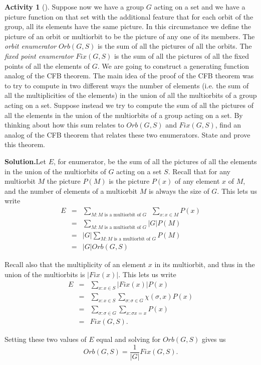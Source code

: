 \documentclass[10pt,]{book}
\theoremstyle{plain}
\theoremstyle{definition}
\newtheorem{activity}[project]{Activity}
\numberwithin{equation}{chapter}
\newcommand{\amp}{&}
\begin{document}
\begin{activity}[]\label{Orbit-FixedPoint}
Suppose now we have a group \(G\) acting on a set and we have a picture function on that set with the additional feature that for each orbit of the group, all its elements have the same picture. In this circumstance we define the picture of an orbit or multiorbit to be the picture of any one of its members. The \emph{orbit enumerator} \({ Orb}(G,S)\) is the sum of all the pictures of all the orbits. The \emph{fixed point enumerator} \({ Fix}(G,S)\) is the sum of all the pictures of all the fixed points of all the elements of \(G\). We are going to construct a generating function analog of the CFB theorem. The main idea of the proof of the CFB theorem was to try to compute in two different ways the number of elements (i.e. the sum of all the multiplicities of the elements) in the union of all the multiorbits of a group acting on a set. Suppose instead we try to compute the sum of all the pictures of all the elements in the union of the multiorbits of a group acting on a set. By thinking about how this sum relates to \({ Orb}(G,S)\) and \({ Fix}(G,S)\), find an analog of the CFB theorem that relates these two enumerators. State and prove this theorem.%
\par\medskip\noindent%
\textbf{Solution.}\quad Let \(E\), for enumerator, be the sum of all the pictures of all the elements in the union of the multiorbits of \(G\) acting on a set \(S\). Recall that for any multiorbit \(M\) the picture \(P(M)\) is the picture \(P(x)\) of any element \(x\) of \(M\), and the number of elements of a multiorbit \(M\) is always the size of \(G\). This lets us write%
\begin{align*}
E\amp =\amp \sum_{M:M\mbox{\ is a multiorbit of \(G\)\ \ } }\sum_{x:x\in M} P(x)\\
\amp =\amp \sum_{M:M\mbox{\ is a multiorbit of \(G\)}  }|G|P(M)\\
\amp =\amp |G|\sum_{M:M\mbox{\ is a multiorbit  of \(G\)} } P(M)\\
\amp =\amp |G|{ Orb}(G,S)
\end{align*}
%
\par
Recall also that the multiplicity of an element \(x\) in its multiorbit, and thus in the union of the multiorbits is \(|Fix(x)|\). This lets us write%
\begin{align*}
E\amp =\amp \sum_{x: x\in S} {|Fix}(x)|P(x)\\
\amp =\amp \sum_{x:x\in S}\sum_{\sigma: \sigma \in G} \chi(\sigma,x)P(x)\\
\amp =\amp \sum_{\sigma: \sigma\in G}\sum_{x: \sigma{x}=x} P(x)\\
\amp =\amp  { Fix}(G,S).
\end{align*}
%
\par
Setting these two values of \(E\) equal and solving for \({ Orb}(G,S)\) gives us%
\begin{equation*}
{ Orb}(G,S) =\frac{1}{|G|}{ Fix}(G,S).
\end{equation*}
%
\end{activity}
\end{document}

